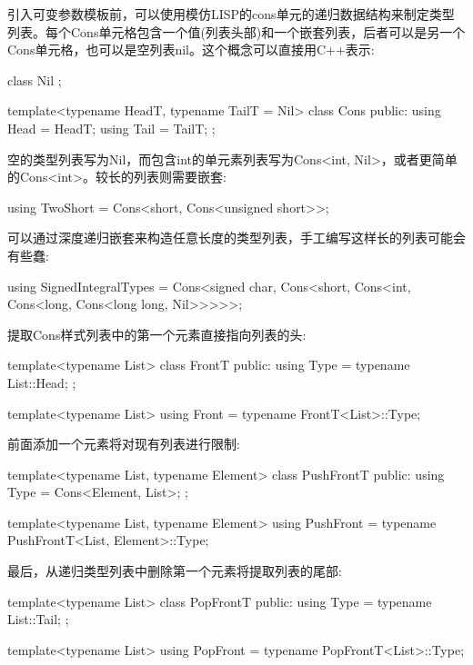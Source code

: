 引入可变参数模板前，可以使用模仿LISP的cons单元的递归数据结构来制定类型列表。每个Cons单元格包含一个值(列表头部)和一个嵌套列表，后者可以是另一个Cons单元格，也可以是空列表nil。这个概念可以直接用C++表示:

\begin{cpp}
class Nil { };

template<typename HeadT, typename TailT = Nil>
class Cons {
	public:
	using Head = HeadT;
	using Tail = TailT;
};
\end{cpp}

空的类型列表写为Nil，而包含int的单元素列表写为Cons<int, Nil>，或者更简单的Cons<int>。较长的列表则需要嵌套:

\begin{cpp}
using TwoShort = Cons<short, Cons<unsigned short>>;
\end{cpp}

可以通过深度递归嵌套来构造任意长度的类型列表，手工编写这样长的列表可能会有些蠢:

\begin{cpp}
using SignedIntegralTypes = Cons<signed char, Cons<short, Cons<int,
							Cons<long, Cons<long long, Nil>>>>>;
\end{cpp}

提取Cons样式列表中的第一个元素直接指向列表的头:

\begin{cpp}
template<typename List>
class FrontT {
	public:
	using Type = typename List::Head;
};

template<typename List>
using Front = typename FrontT<List>::Type;
\end{cpp}

前面添加一个元素将对现有列表进行限制:

\begin{cpp}
template<typename List, typename Element>
class PushFrontT {
	public:
	using Type = Cons<Element, List>;
};

template<typename List, typename Element>
using PushFront = typename PushFrontT<List, Element>::Type;
\end{cpp}

最后，从递归类型列表中删除第一个元素将提取列表的尾部:

\begin{cpp}
template<typename List>
class PopFrontT {
	public:
	using Type = typename List::Tail;
};

template<typename List>
using PopFront = typename PopFrontT<List>::Type;
\end{cpp}

